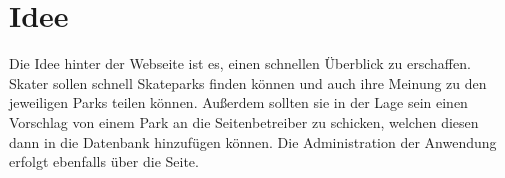 \section{Idee}
\label{idee}

Die Idee hinter der Webseite ist es, einen schnellen Überblick zu erschaffen. Skater sollen schnell 
Skateparks finden können und auch ihre Meinung zu den jeweiligen Parks teilen können. Außerdem sollten 
sie in der Lage sein einen Vorschlag von einem Park an die Seitenbetreiber zu schicken, welchen 
diesen dann in die Datenbank hinzufügen können. Die Administration der Anwendung erfolgt ebenfalls
über die Seite. 
